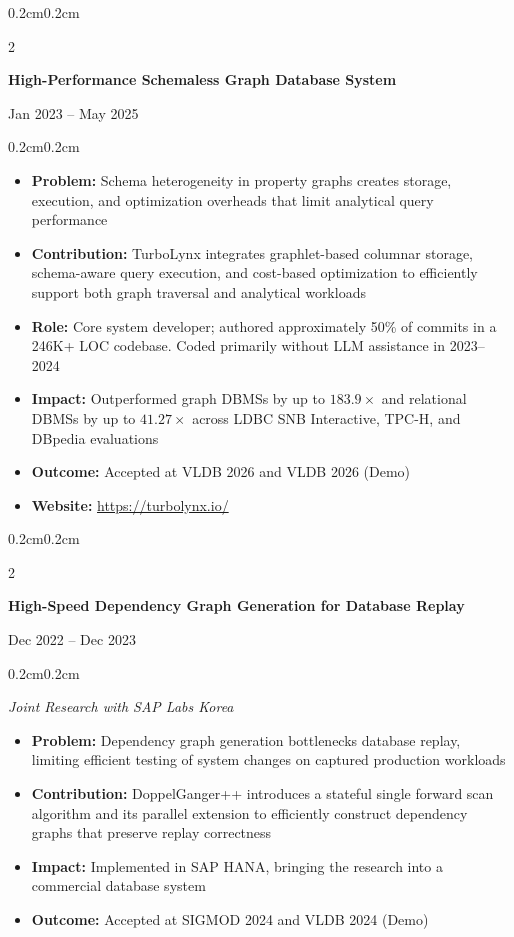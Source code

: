 \documentclass[10pt, letterpaper]{article}
\newenvironment{highlights}[1][]{
    \begin{itemize}[
        topsep=0.10cm,
        parsep=0.10cm,
        partopsep=0pt,
        itemsep=0pt,
        leftmargin=0.4cm+10pt,
        #1
    ]
}{
    \end{itemize}
}
\newenvironment{onecolentry}{
    \begin{adjustwidth}{0.2cm}{0.2cm}
}{
    \end{adjustwidth}
}
\newenvironment{twocolentry}[2][]{
    \onecolentry
    \def\secondColumn{#2}
    \setcolumnwidth{\fill, 4.5cm}
    \begin{paracol}{2}
}{
    \switchcolumn \raggedleft \secondColumn
    \end{paracol}
    \endonecolentry
}
\begin{document}
\vspace{2mm} %

\begin{twocolentry}{Jan 2023 -- May 2025}
\textbf{High-Performance Schemaless Graph Database System}
\end{twocolentry}
\begin{onecolentry}
\begin{highlights}[parsep=0pt]
    \item \textbf{Problem:} Schema heterogeneity in property graphs creates storage, execution, and optimization overheads that limit analytical query performance
    \item \textbf{Contribution:} TurboLynx integrates graphlet-based columnar storage, schema-aware query execution, and cost-based optimization to efficiently support both graph traversal and analytical workloads
    \item \textbf{Role:} Core system developer; authored approximately 50\% of commits in a 246K+ LOC codebase. Coded primarily without LLM assistance in 2023--2024
    \item \textbf{Impact:} Outperformed graph DBMSs by up to $183.9\times$ and relational DBMSs by up to $41.27\times$ across LDBC SNB Interactive, TPC-H, and DBpedia evaluations
    \item \textbf{Outcome:} Accepted at VLDB 2026 and VLDB 2026 (Demo)
    \item \textbf{Website:} \url{https://turbolynx.io/}
\end{highlights}
\end{onecolentry}

\vspace{2mm}

\begin{twocolentry}{Dec 2022 -- Dec 2023}
\textbf{High-Speed Dependency Graph Generation for Database Replay}
\end{twocolentry}
\begin{onecolentry}
\textit{Joint Research with SAP Labs Korea}
\begin{highlights}[parsep=0pt]
    \item \textbf{Problem:} Dependency graph generation bottlenecks database replay, limiting efficient testing of system changes on captured production workloads
    \item \textbf{Contribution:} DoppelGanger++ introduces a stateful single forward scan algorithm and its parallel extension to efficiently construct dependency graphs that preserve replay correctness
    \item \textbf{Impact:} Implemented in SAP HANA, bringing the research into a commercial database system
    \item \textbf{Outcome:} Accepted at SIGMOD 2024 and VLDB 2024 (Demo)
\end{highlights}
\end{onecolentry}
\end{document}
